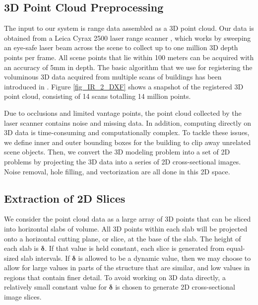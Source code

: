 \documentclass[12pt,letterpaper]{article}
\begin{document}
\subsection{3D Point Cloud Preprocessing}
\label{sec_prep}
The input to our system is range data assembled as a 3D point cloud.
Our data is obtained from a Leica Cyrax 2500 laser range scanner \cite{RDP_LRS},
which works by sweeping an eye-safe laser beam across the scene to collect
up to one million 3D depth points per frame.
All scene points that lie within 100 meters can be acquired with an accuracy
of 5mm in depth.
The basic algorithm that we use for registering the voluminous 3D data
acquired from multiple scans of buildings has been introduced in
\cite{RDP_LS}.
Figure \ref{fig_IR_2_DXF} shows a snapshot of the
registered 3D point cloud, consisting of 14 scans totalling 14 million points.

Due to occlusions and limited vantage points, the point cloud collected by the
laser scanner \cite{RDP_LRS} contains noise and missing data.
In addition, computing directly on 3D data is time-consuming and
computationally complex.
To tackle these issues, we define inner and outer bounding boxes for the
building to clip away unrelated scene objects.
Then, we convert the 3D modeling problem into a set of 2D problems by
projecting the 3D data into a series of 2D cross-sectional images.
Noise removal, hole filling, and vectorization are all done in this
2D space.

\subsection{Extraction of 2D Slices}
\label{sec_image_slicing}
We consider the point cloud data as a large array of 3D points that can be
sliced into horizontal slabs of volume.
All 3D points within each slab will be projected onto a horizontal cutting
plane, or slice, at the base of the slab.
The height of each slab is $\boldsymbol{\delta}$.
If that value is held constant, each slice is generated from equal-sized
slab intervals.
If $\boldsymbol{\delta}$ is allowed to be a dynamic value, then we may
choose to allow for large values in parts of the structure that are similar,
and low values in regions that contain finer detail.
To avoid working on 3D data directly, a relatively small constant value
for $\boldsymbol{\delta}$ is chosen to generate 2D cross-sectional image slices.
\end{document}
